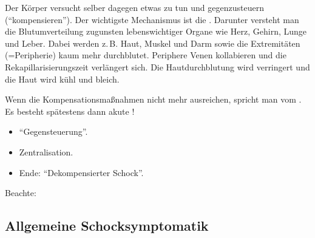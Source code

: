 {
Der Körper versucht selber dagegen etwas zu tun und gegenzusteuern
("`kompensieren"'). Der
wichtigste Mechanismus ist die
. Darunter versteht
man die Blutumverteilung zugunsten lebenswichtiger Organe wie
Herz, Gehirn, Lunge und Leber. Dabei werden z.\,B. Haut, Muskel
und Darm
sowie die Extremitäten (=Peripherie) kaum mehr  durchblutet.
Periphere Venen kollabieren und die Rekapillarisierungszeit
verlängert sich. Die Hautdurchblutung wird verringert und
die Haut wird kühl und bleich.

Wenn die Kompensationsmaßnahmen 
nicht mehr ausreichen, spricht man vom . Es besteht
spätestens dann akute !
}{
\begin{itemize}
    \item "`Gegensteuerung"'.
    \item Zentralisation.
    \item Ende: "`Dekompensierter Schock"'.
\end{itemize}
}{}{}{}



Beachte: 



\subsection{Allgemeine Schocksymptomatik}
\label{topic:schock-allgemeine-symptomatik}

